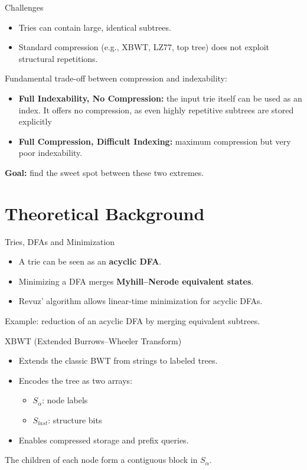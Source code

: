 \documentclass[aspectratio=169]{beamer}
\begin{document}
\begin{frame}{Challenges}
  \begin{itemize}
    \item Tries can contain large, identical subtrees.
    \item Standard compression (e.g., XBWT, LZ77, top tree) does not exploit structural repetitions.
  \end{itemize}

  \vspace{0.3cm}
  Fundamental trade-off between compression and indexability:
      \begin{itemize}
        \item \textbf{Full Indexability, No Compression:} the input trie itself can be used as an index. It offers no compression, as even highly repetitive subtrees are stored explicitly
        \item \textbf{Full Compression, Difficult Indexing:} maximum compression but very poor indexability.
      \end{itemize}
  \textbf{Goal:} find the sweet spot between these two extremes.
\end{frame}


\section{Theoretical Background}
\begin{frame}{Tries, DFAs and Minimization}
  \begin{itemize}
    \item A trie can be seen as an \textbf{acyclic DFA}.
    \item Minimizing a DFA merges \textbf{Myhill–Nerode equivalent states}.
    \item Revuz’ algorithm allows linear-time minimization for acyclic DFAs.
  \end{itemize}
  \centering
  \small
  Example: reduction of an acyclic DFA by merging equivalent subtrees.
\end{frame}

\begin{frame}{XBWT (Extended Burrows–Wheeler Transform)}
  \begin{itemize}
    \item Extends the classic BWT from strings to labeled trees.
    \item Encodes the tree as two arrays:
      \begin{itemize}
        \item $S_\alpha$: node labels
        \item $S_{last}$: structure bits
      \end{itemize}
    \item Enables compressed storage and prefix queries.
  \end{itemize}
  \centering
  \small
  The children of each node form a contiguous block in $S_\alpha$.
\end{frame}
\end{document}
